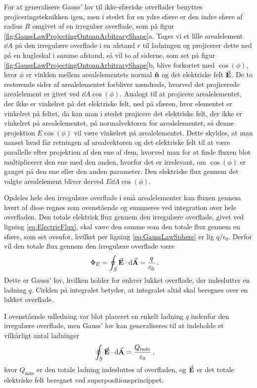 For at generalisere Gauss' lov til ikke-sfæriske overflader benyttes projiceringsteknikken igen, men i stedet for en ydre sfære er den indre sfære af radius $R$ omgivet af en irregulær overflade, som på figur \ref{fig:GaussLawProjectingOntoanArbitraryShape}a. Tager vi et lille arealelement $\dd{A}$ på den irregulære overflade i en afstand $r$ til ladningen og projicerer dette ned på en kugleskal i samme afstand, så vil to af siderne, som set på figur \ref{fig:GaussLawProjectingOntoanArbitraryShape}b, blive forkortet med $\cos(\phi)$, hvor $\phi$ er vinklen mellem arealelementets normal $\vu{n}$ og det elektriske felt $\va{E}$. De to resterende sider af arealelementet forbliver uændrede, hvorved det projicerede arealelement er givet ved $\dd{A}\cos(\phi)$. Analogt til at projicere arealelementet, der ikke er vinkelret på det elektriske felt, ned på sfæren, hvor elementet er vinkelret på feltet, da kan man i stedet projicere det elektriske felt, der ikke er vinkelret på arealelementet, på normalvektoren for arealelementet, så denne projektion $E\cos(\phi)$ vil være vinkelret på arealelementet. Dette skyldes, at man uanset hvad får retningen af arealvektoren og det elektriske felt til at være parallelle efter projektion af den ene af dem, hvorved man for at finde fluxen blot multiplicerer den ene med den anden, hvorfor det er irrelevant, om $\cos(\phi)$ er ganget på den ene eller den anden parameter. Den elektriske flux gennem det valgte arealelement bliver derved $E\dd{A}\cos(\phi)$.

Opdeles hele den irregulære overflade i små arealelementer kan fluxen gennem hvert af disse regnes som ovenstående og summeres ved integration over hele overfladen. Den totale elektrisk flux gennem den irregulære overflade, givet ved ligning \eqref{eq:ElectricFlux}, skal være den samme som den totale flux gennem en sfære, som set ovenfor, hvilket per ligning \eqref{eq:GaussLawSphere} er lig $q/\epsilon_0$. Derfor vil den totale flux gennem den irregulære overflade være
\begin{align} \label{eq:GaussLawArbitraryShape}
    \Phi_E &= \oint_S \va{E} \cdot \dd{\va{A}} = \frac{q}{\varepsilon_0} \: .
\end{align}
Dette er Gauss' lov, hvilken holder for enhver lukket overflade, der indeslutter en ladning $q$. Cirklen på integralet betyder, at integralet altid skal beregnes over en lukket overflade.

I ovenstående udledning var blot placeret en enkelt ladning $q$ indenfor den irregulære overflade, men Gauss' lov kan generaliseres til at indeholde et vilkårligt antal ladninger
\begin{align} \label{eq:GaussLawGeneral}
    \oint_S \va{E} \cdot \dd{\va{A}} &= \frac{Q_{\text{inde}}}{\varepsilon_0} \: ,
\end{align}
hvor $Q_{\text{inde}}$ er den totale ladning indesluttes af overfladen, og $\va{E}$ er det totale elektriske felt beregnet ved superpositionsprincippet.

